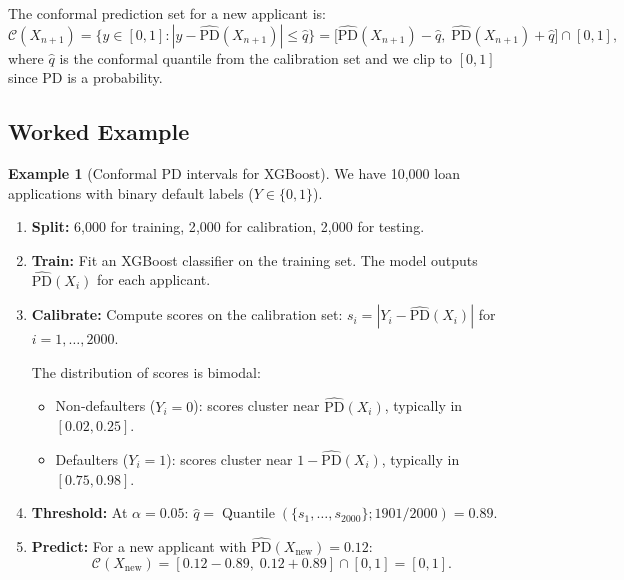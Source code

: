 \documentclass[11pt, a4paper]{article}
\theoremstyle{definition}
\newtheorem{example}{Example}[section]
\theoremstyle{plain}
\theoremstyle{remark}
\newcommand{\Ccal}{\mathcal{C}}
\DeclareMathOperator{\Quantile}{Quantile}
\begin{document}
The conformal prediction set for a new applicant is:
\begin{equation}\label{eq:pd-interval}
    \Ccal(X_{n+1}) = \bigl\{y \in [0,1] :
    |y - \widehat{\mathrm{PD}}(X_{n+1})| \leq \hat{q}\bigr\}
    = \bigl[\widehat{\mathrm{PD}}(X_{n+1}) - \hat{q},\;
    \widehat{\mathrm{PD}}(X_{n+1}) + \hat{q}\bigr] \cap [0, 1],
\end{equation}
where $\hat{q}$ is the conformal quantile from the calibration set and we clip
to $[0, 1]$ since PD is a probability.

\subsection{Worked Example}

\begin{example}[Conformal PD intervals for XGBoost]\label{ex:conformal-pd}
We have 10{,}000 loan applications with binary default labels ($Y \in \{0, 1\}$).
\begin{enumerate}
    \item \textbf{Split:} 6{,}000 for training, 2{,}000 for calibration,
          2{,}000 for testing.
    \item \textbf{Train:} Fit an XGBoost classifier on the training set.
          The model outputs $\widehat{\mathrm{PD}}(X_i)$ for each applicant.
    \item \textbf{Calibrate:} Compute scores on the calibration set:
          $s_i = |Y_i - \widehat{\mathrm{PD}}(X_i)|$ for $i = 1, \ldots, 2000$.

          The distribution of scores is bimodal:
          \begin{itemize}
              \item Non-defaulters ($Y_i = 0$): scores cluster near
                    $\widehat{\mathrm{PD}}(X_i)$, typically in $[0.02, 0.25]$.
              \item Defaulters ($Y_i = 1$): scores cluster near
                    $1 - \widehat{\mathrm{PD}}(X_i)$, typically in $[0.75, 0.98]$.
          \end{itemize}

    \item \textbf{Threshold:} At $\alpha = 0.05$:
          $\hat{q} = \Quantile(\{s_1, \ldots, s_{2000}\}; 1901/2000) = 0.89$.

    \item \textbf{Predict:} For a new applicant with
          $\widehat{\mathrm{PD}}(X_{\mathrm{new}}) = 0.12$:
          \[
              \Ccal(X_{\mathrm{new}}) = [0.12 - 0.89,\; 0.12 + 0.89] \cap [0, 1]
              = [0, 1].
          \]
\end{enumerate}
\end{example}
\end{document}

